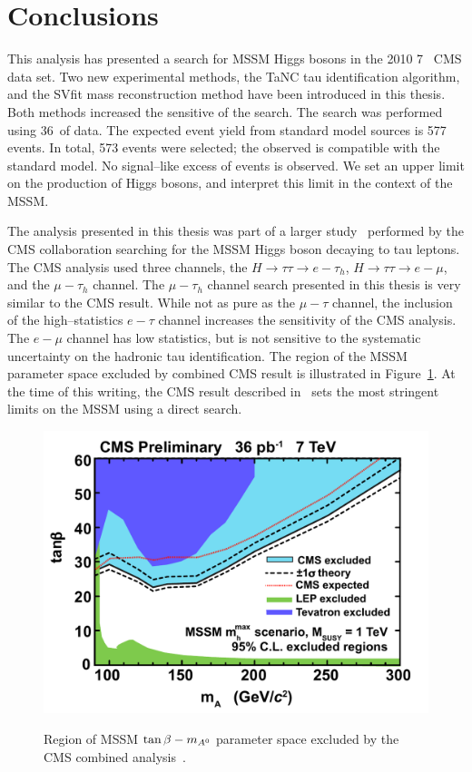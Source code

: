 \ifx\master\undefined\fi
%
\chapter*{Conclusions}
\label{ch:conclusions}

This analysis has presented a search for MSSM Higgs bosons in the 2010 7~\TeV
CMS data set. Two new experimental methods, the TaNC tau identification
algorithm, and the SVfit mass reconstruction method have been introduced in this
thesis.  Both methods increased the sensitive of the search.  The search
was performed using 36~\pbinv of data.  The expected event yield from standard
model sources is 577 events. In total, 573 events were selected; the observed is
compatible with the standard model.  No signal--like excess of events is
observed.  We set an upper limit on the production of Higgs bosons, and
interpret this limit in the context of the MSSM.

The analysis presented in this thesis was part of a larger
study~\cite{HIG-10-002} performed by the CMS collaboration searching for the
MSSM Higgs boson decaying to tau leptons.  The CMS analysis used three channels,
the $H \to \tau \tau \to e-\tau_h$, $H \to \tau \tau \to e-\mu$, and the
$\mu-\tau_h$ channel.  The $\mu-\tau_h$ channel search presented in this thesis
is very similar to the CMS result.  While not as pure as the $\mu-\tau$ channel,
the inclusion of the high--statistics $e-\tau$ channel increases the sensitivity
of the CMS analysis.  The $e-\mu$ channel has low statistics, but is not
sensitive to the systematic uncertainty on the hadronic tau identification.  The
region of the MSSM parameter space excluded by combined CMS result is
illustrated in Figure~\ref{fig:CMSTanBetaExclusion}.  At the time of this
writing, the CMS result described in~\cite{HIG-10-002} sets the most stringent
limits on the MSSM using a direct search.  
%
\begin{figure}[htb]
  \centering
  \includegraphics[width=\textwidth]{conclusions_chapter/figures/tanbeta-ma-LEP-Tev.pdf}
  \label{fig:CMSTanBetaExclusion} 
  \caption[CMS combined exclusion of MSSM $\tb-\ma$ parameter space]{Region of MSSM
  $\tb-\ma$ parameter space excluded by the CMS combined
  analysis~\cite{HIG-10-002}.}
\end{figure}

\ifx\master\undefined\fi
